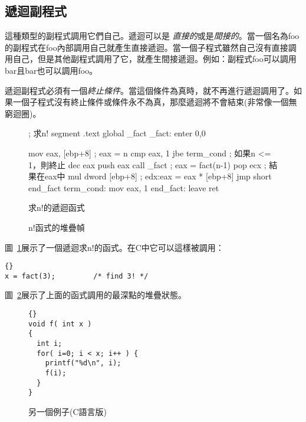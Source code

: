 \subsection{遞迴副程式}

這種類型的副程式調用它們自己。遞迴可以是
\emph{直接的}或是\emph{間接的}。當一個名為{\code foo}的副程式在{\code foo}內部調用自己就產生直接遞迴。當一個子程式雖然自己沒有直接調用自己，但是其他副程式調用了它，就產生間接遞迴。例如：副程式{\code foo}可以調用
{\code bar}且{\code bar}也可以調用{\code foo}。

遞迴副程式必須有一個\emph{終止條件}。當這個條件為真時，就不再進行遞迴調用了。如果一個子程式沒有終止條件或條件永不為真，那麼遞迴將不會結束(非常像一個無窮迴圈)。

\begin{figure}
\begin{AsmCodeListing}[frame=single]
; 求n!
segment .text
      global _fact
_fact:
      enter  0,0

      mov    eax, [ebp+8]    ; eax = n
      cmp    eax, 1
      jbe    term_cond       ; 如果n <= 1，則終止
      dec    eax
      push   eax
      call   _fact           ; eax = fact(n-1)
      pop    ecx             ; 結果在eax中
      mul    dword [ebp+8]   ; edx:eax = eax * [ebp+8]
      jmp    short end_fact
term_cond:
      mov    eax, 1
end_fact:
      leave
      ret
\end{AsmCodeListing}
\caption{求n!的遞迴函式\label{fig:factorial}}
\end{figure}

\begin{figure}
\centering

\caption{n!函式的堆疊幀\label{fig:factStack}}
\end{figure}

圖~\ref{fig:factorial}展示了一個遞迴求n!的函式。在C中它可以這樣被調用：
\begin{lstlisting}[stepnumber=0]{}
x = fact(3);         /* find 3! */
\end{lstlisting}
圖~\ref{fig:factStack}展示了上面的函式調用的最深點的堆疊狀態。

\begin{figure}[t]
\begin{lstlisting}[frame=tlrb]{}
void f( int x )
{
  int i;
  for( i=0; i < x; i++ ) {
    printf("%d\n", i);
    f(i);
  }
}
\end{lstlisting}
\caption{另一個例子(C語言版)\label{fig:rec2C}}
\end{figure}

